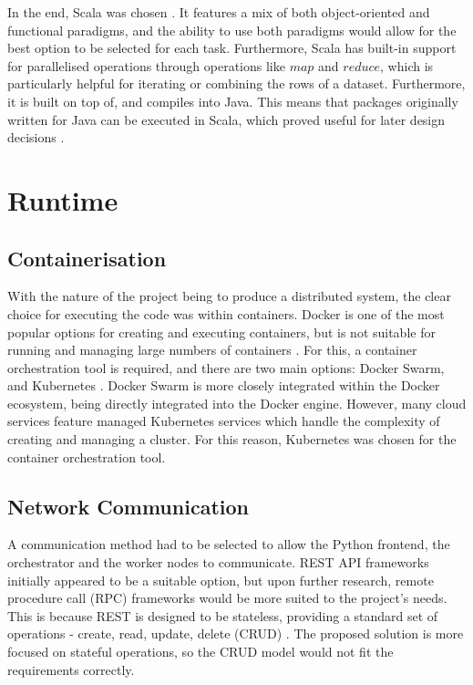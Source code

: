 In the end, Scala was chosen \cite{scaladocs}. It features a mix of both object-oriented and functional paradigms, and the ability to use both paradigms would allow for the best option to be selected for each task. Furthermore, Scala has built-in support for parallelised operations through operations like $map$ and $reduce$, which is particularly helpful for iterating or combining the rows of a dataset. Furthermore, it is built on top of, and compiles into Java. This means that packages originally written for Java can be executed in Scala, which proved useful for later design decisions \cite{scalaforjavadevs}.
 
\section{Runtime}
\subsection{Containerisation}
With the nature of the project being to produce a distributed system, the clear choice for executing the code was within containers. Docker is one of the most popular options for creating and executing containers, but is not suitable for running and managing large numbers of containers \cite{orchestrationdockerdocs}. For this, a container orchestration tool is required, and there are two main options: Docker Swarm, and Kubernetes \cite{dockerswarm, k8sapi}. Docker Swarm is more closely integrated within the Docker ecosystem, being directly integrated into the Docker engine. However, many cloud services feature managed Kubernetes services which handle the complexity of creating and managing a cluster. For this reason, Kubernetes was chosen for the container orchestration tool.

\subsection{Network Communication} 
A communication method had to be selected to allow the Python frontend, the orchestrator and the worker nodes to communicate. REST API frameworks initially appeared to be a suitable option, but upon further research, remote procedure call (RPC) frameworks would be more suited to the project's needs. This is because REST is designed to be stateless, providing a standard set of operations - create, read, update, delete (CRUD) \cite{masse2011rest}. The proposed solution is more focused on stateful operations, so the CRUD model would not fit the requirements correctly. 

